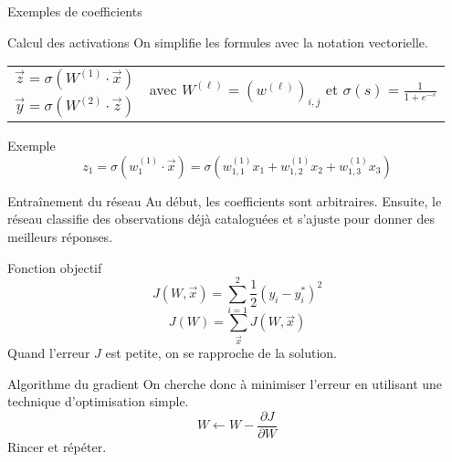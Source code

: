 \documentclass[serif]{beamer} %
\theoremstyle{definition}
\theoremstyle{remark}
\begin{document}
\begin{frame}{Exemples de coefficients}
\begin{center}
	\end{center}
\end{frame}

\begin{frame}{Calcul des activations}
On simplifie les formules avec la notation vectorielle.
\begin{table}[]
	\centering
	\begin{tabular}{ll}
		$\vec{z} = \sigma\left(W^{(1)}\cdot \vec{x}\right)$& \multirow{2}{*}{avec $W^{(\ell)} = (w^{(\ell)})_{i,j}$ et $\sigma(s) = \frac{1}{1+e^{-s}}$} \\
		$\vec{y} = \sigma \left(W^{(2)}\cdot \vec{z}\right)$&
	\end{tabular}
\end{table}
\pause
\begin{block}{Exemple}
	\[z_1 =\sigma \left( w^{(1)}_1 \cdot \vec{x}\right) = \sigma \left(w^{(1)}_{1,1}x_1 + w^{(1)}_{1,2}x_2 + w^{(1)}_{1,3}x_3\right) \]
\end{block}
\end{frame}

\begin{frame}{Entraînement du réseau}
	Au début, les coefficients sont arbitraires. Ensuite, le réseau classifie des observations déjà cataloguées et s'ajuste pour donner des meilleurs réponses.
	\pause
	\begin{block}{Fonction objectif}
		\[ J(W, \vec{x}) = \sum_{i=1}^2 \frac{1}{2}(y_i-y_i^*)^2\]
		\[ J(W) = \sum_{\vec{x}} J(W,\vec{x}) \]
		\pause
		Quand l'erreur $J$ est petite, on se rapproche de la solution.
	\end{block}
\end{frame}
\begin{frame}{Algorithme du gradient}
	On cherche donc à minimiser l'erreur en utilisant une technique d'optimisation simple.
	\pause
	\[ W \leftarrow W - \frac{\partial J}{\partial W} \]
	\pause
	Rincer et répéter.
\end{frame}
\end{document}

